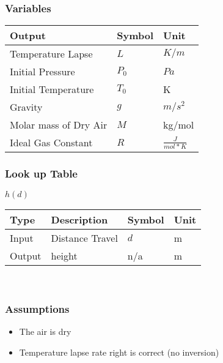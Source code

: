 \documentclass[../SimBALink.tex]{subfiles}
\begin{document}
\subsubsection{Variables}
	\begin{tabular}{ l | l | l  }
		Output					&	Symbol		&	Unit		\\	\hline
		Temperature Lapse		&	$L$			&	 $K/m$ \\
		Initial Pressure 		&  $P_0$		&	$Pa$ \\
		Initial Temperature		&  $T_0$		&	K \\
		Gravity 				&  $g$			&  $m/s^2$ \\
		Molar mass of Dry Air	& $M$			&  kg/mol \\
		Ideal Gas Constant 		& $R$			& $\frac{J}{mol * K}$
	\end{tabular}
	
	\subsubsection{Look up Table}
	$h(d)$ \\
	\begin{tabular}{ l | l | l | l }
		Type				& Description		&	Symbol		&	Unit		\\	\hline
		Input 				& Distance Travel	&	$d$  		& m		\\
		Output 				& height 			&	n/a			&  m
	\end{tabular} \\
\subsubsection{Assumptions}
\begin{itemize}
  \item The air is dry 
  \item Temperature lapse rate right is correct (no inversion)
\end{itemize}
\end{document}
